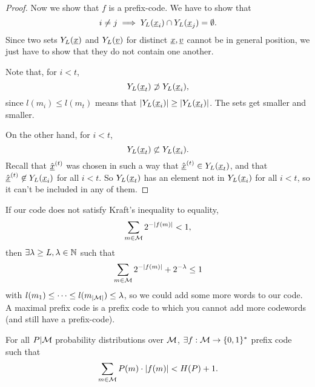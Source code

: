 \begin{proof}
	Now we show that $f$ is a prefix-code.
	We have to show that
	\begin{equation*}
		i \neq j \implies Y_L(\underline{x}_i) \cap Y_L(\underline{x}_j) = \emptyset.
	\end{equation*}
	Since two sets $Y_L(\underline{x})$ and $Y_L(\underline{v})$ for distinct $\underline{x}, \underline{v}$ cannot be in general position, we just have to show that they do not contain one another.

	Note that, for $i < t$,
	\begin{equation*}
		Y_L(\underline{x}_t) \not\supset Y_L(\underline{x}_i),
	\end{equation*}
	since $l(m_i) \le l(m_t)$ means that $\left|{Y_L(\underline{x}_i)}\right| \ge \left|{Y_L(\underline{x}_t)}\right|$.
	The sets get smaller and smaller.

	On the other hand, for $i < t$,
	\begin{equation*}
		Y_L(\underline{x}_t) \not\subset Y_L(\underline{x}_i).
	\end{equation*}
	Recall that $\hat{\underline{x}}^{(t)}$ was chosen in such a way that $\hat{\underline{x}}^{(t)} \in Y_L(\underline{x}_t)$, and that $\hat{\underline{x}}^{(t)} \not\in Y_L(\underline{x}_i)$ for all $i < t$.
	So $Y_L(\underline{x}_t)$ has an element not in $Y_L(\underline{x}_i)$ for all $i < t$, so it can't be included in any of them.
\end{proof}

If our code does not satisfy Kraft's inequality to equality, \ie
\begin{equation*}
	\sum_{m \in \mathcal{M}} 2^{-\left|{f(m)}\right|} < 1,
\end{equation*}
then $\exists \lambda \ge L, \lambda \in \mathbb{N}$  such that
\begin{equation*}
	\sum_{m \in \mathcal{M}} 2^{-\left|{f(m)}\right|} + 2^{-\lambda} \le 1
\end{equation*}
with $l(m_1) \le \dots \le l(m_{\left|{\mathcal{M}}\right|}) \le \lambda$, so we could add some more words to our code.
A maximal prefix code is a prefix code to which you cannot add more codewords (and still have a prefix-code).

\begin{prop} \label{prop:prefix-entropy-lower}
	For all $P|\mathcal{M}$ probability distributions over $\mathcal{M}$, $\exists f : \mathcal{M} \to \{0, 1\}^*$ prefix code such that
	\begin{equation*}
		\sum_{m \in \mathcal{M}} P(m) \cdot \left|{f(m)}\right| < H(P) + 1.
	\end{equation*}
\end{prop}

